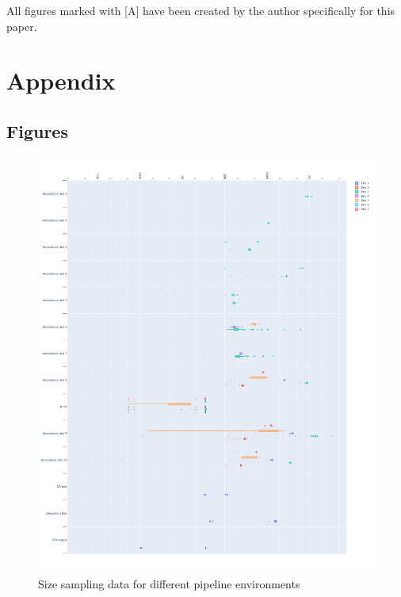 \printreferences

All figures marked with [A] have been created by the author specifically for this paper.

\pagebreak

\appendix
\section*{Appendix}
\renewcommand{\thesubsection}{\Alph{subsection}}

\subsection{Figures}
\begin{figure}
    \includegraphics[width=\linewidth]{image/graphs/artifacts-boxplot.pdf}
    \caption{Size sampling data for different pipeline environments}
    \label{fig:size-boxplot}
\end{figure}

